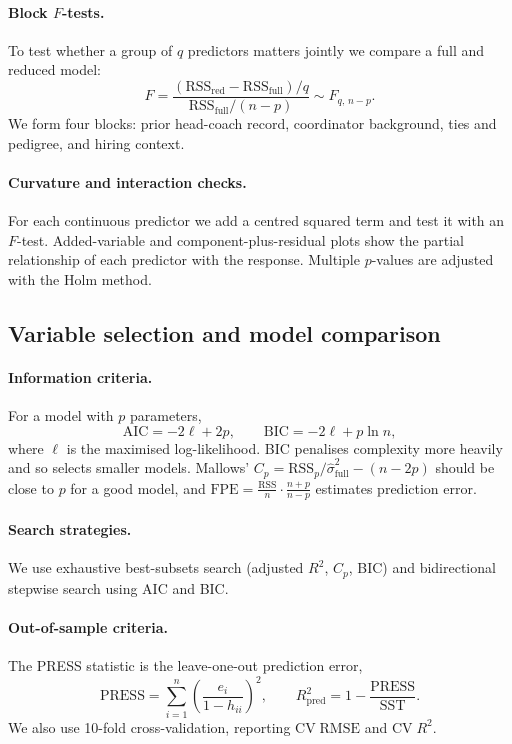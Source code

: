 \documentclass[9pt,a4paper]{article}
\begin{document}
\paragraph{Block $F$-tests.} To test whether a group of $q$ predictors matters jointly we compare a full and reduced model:
\[
F=\frac{(\mathrm{RSS}_{\text{red}}-\mathrm{RSS}_{\text{full}})/q}{\mathrm{RSS}_{\text{full}}/(n-p)}\sim F_{q,\,n-p}.
\]
We form four blocks: prior head-coach record, coordinator background, ties and pedigree, and hiring context.

\paragraph{Curvature and interaction checks.} For each continuous predictor we add a centred squared term and test it with an $F$-test. Added-variable and component-plus-residual plots show the partial relationship of each predictor with the response. Multiple $p$-values are adjusted with the Holm method.

\subsection{Variable selection and model comparison}
\paragraph{Information criteria.} For a model with $p$ parameters,
\[
\mathrm{AIC}=-2\ell+2p,\qquad \mathrm{BIC}=-2\ell+p\ln n,
\]
where $\ell$ is the maximised log-likelihood. BIC penalises complexity more heavily and so selects smaller models. Mallows' $C_p=\mathrm{RSS}_p/\hat\sigma^2_{\text{full}}-(n-2p)$ should be close to $p$ for a good model, and $\mathrm{FPE}=\frac{\mathrm{RSS}}{n}\cdot\frac{n+p}{n-p}$ estimates prediction error.

\paragraph{Search strategies.} We use exhaustive best-subsets search (adjusted $R^2$, $C_p$, BIC) and bidirectional stepwise search using AIC and BIC.

\paragraph{Out-of-sample criteria.} The PRESS statistic is the leave-one-out prediction error,
\[
\mathrm{PRESS}=\sum_{i=1}^n\left(\frac{e_i}{1-h_{ii}}\right)^2,\qquad R^2_{\text{pred}}=1-\frac{\mathrm{PRESS}}{\mathrm{SST}}.
\]
We also use 10-fold cross-validation, reporting $\mathrm{CV\;RMSE}$ and $\mathrm{CV}\;R^2$.
\end{document}

